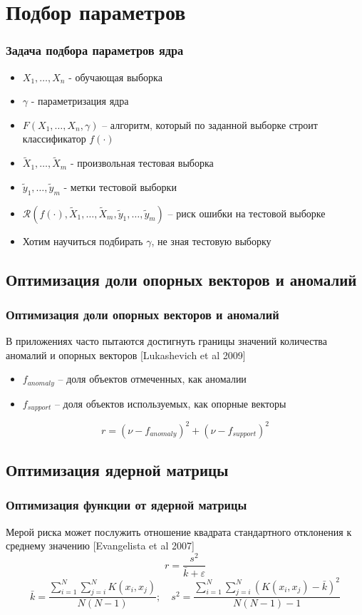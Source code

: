 \documentclass[10pt,pdf]{beamer}
\begin{document}

\section{Подбор параметров}

\begin{frame}\frametitle{Задача подбора параметров ядра}
\begin{itemize}
\item $X_1, \ldots, X_n$ - обучающая выборка
\item $\gamma$ - параметризация ядра
\item $F(X_1, \ldots, X_n, \gamma)$ -- алгоритм, который по заданной выборке строит классификатор $f(\cdot)$
\item $\tilde{X}_1, \ldots, \tilde{X}_m$ - произвольная тестовая выборка
\item $\tilde{y}_1, \ldots, \tilde{y}_m$ - метки тестовой выборки
\item $\mathcal{R}(f(\cdot), \tilde{X}_1, \ldots, \tilde{X}_m, \tilde{y}_1, \ldots, \tilde{y}_m)$ -- риск ошибки на тестовой выборке
\item Хотим научиться подбирать $\gamma$, не зная тестовую выборку
\end{itemize}
\end{frame}


\subsection{Оптимизация доли опорных векторов и аномалий}
\begin{frame}\frametitle{Оптимизация доли опорных векторов и аномалий}
В приложениях часто пытаются достигнуть границы значений количества аномалий и опорных векторов [Lukashevich et al 2009]
\begin{itemize}
\item $f_{anomaly}$ -- доля объектов отмеченных, как аномалии
\item $f_{support}$ -- доля объектов используемых, как опорные векторы
\end{itemize}
\[
r = (\nu - f_{anomaly})^2 + (\nu - f_{support})^2
\]

\end{frame}	

\subsection{Оптимизация ядерной матрицы}
\begin{frame}\frametitle{Оптимизация функции от ядерной матрицы}
Мерой риска может послужить отношение квадрата стандартного отклонения к среднему значению [Evangelista et al 2007]
\[
r = \frac{s^2}{\bar{k} + \varepsilon}
\]
\[
\bar{k} = \frac{\sum\limits_{i=1}^N\sum\limits_{j=i}^N K(x_i,x_j)}{N(N-1)}; \quad 
s^2 = \frac{\sum\limits_{i=1}^N\sum\limits_{j=i}^N (K(x_i,x_j) - \bar{k})^2}{N(N-1) - 1}
\]
\end{frame}
\end{document}
